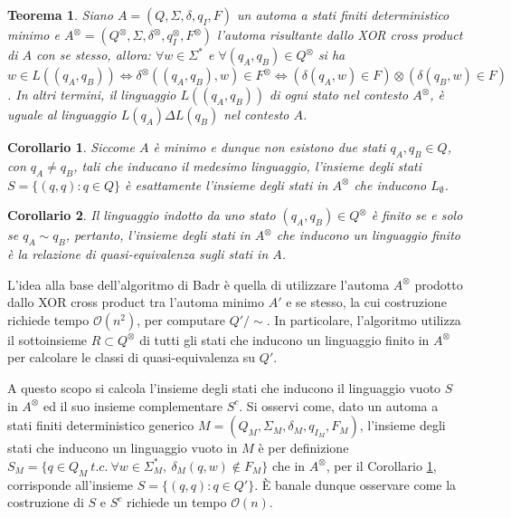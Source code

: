 \documentclass[a4paper,12pt]{report} %
\newcommand{\partitioned}[2]{#1\slash\!\!#2}  %
\newcommand{\bigo}[0]{\mathcal{O}}            %
\newtheorem{theorem}{Teorema}[chapter]        %
\newtheorem{corollary}{Corollario}[theorem]   %
\begin{document}
\begin{theorem}\label{th:cross-prod-state-aeq}
  Siano $A = (Q, \Sigma, \delta, q_I, F)$ un automa a stati finiti deterministico minimo e 
  $A^\otimes = (Q^\otimes, \Sigma, \delta^\otimes, q_{I}^\otimes, F^\otimes)$ l'automa risultante dallo 
  XOR cross product di $A$ con se stesso, allora: $\forall w \in \Sigma^*$ e $\forall (q_A, q_B) \in Q^\otimes$
  si ha $w \in L((q_A, q_B)) \Leftrightarrow \delta^\otimes((q_A, q_B), w) \in F^\otimes \Leftrightarrow 
  (\delta(q_A, w) \in F) \otimes (\delta(q_B, w) \in F)$.
  In altri termini, il linguaggio $L((q_A, q_B))$ di ogni stato nel contesto $A^\otimes$, è uguale al linguaggio
  $L(q_A) \Delta L(q_B)$ nel contesto $A$.
\end{theorem}
\begin{corollary}\label{cor:cross-prod-state-aeq-S}
  Siccome $A$ è minimo e dunque non esistono due stati $q_A, q_B \in Q$, con $q_A \neq q_B$, tali che inducano 
  il medesimo linguaggio, l'insieme degli stati $S = \{ (q, q) : q \in Q \}$ è esattamente l'insieme degli
  stati in $A^\otimes$ che inducono $L_\emptyset$.
\end{corollary}
\begin{corollary}\label{cor:cross-prod-state-aeq-states}
  Il linguaggio indotto da uno stato $(q_A, q_B) \in Q^\otimes$ è finito se e solo se $q_A \sim q_B$, pertanto, 
  l'insieme degli stati in $A^\otimes$ che inducono un linguaggio finito è la relazione di quasi-equivalenza
  sugli stati in $A$.
\end{corollary}

L'idea alla base dell'algoritmo di Badr è quella di utilizzare l'automa $A^\otimes$ prodotto dallo 
XOR cross product tra l'automa minimo $A'$ e se stesso, la cui costruzione richiede tempo $\bigo(n^2)$,
per computare $\partitioned{Q'}{\sim}$.
In particolare, l'algoritmo utilizza il sottoinsieme $R \subset Q^\otimes$ di tutti gli stati
che inducono un linguaggio finito in $A^\otimes$ per calcolare le classi di quasi-equivalenza su $Q'$.

A questo scopo si calcola l'insieme degli stati che inducono il linguaggio vuoto $S$ in $A^\otimes$ ed il suo 
insieme complementare $S^c$. Si osservi come, dato un automa a stati finiti deterministico generico 
$M = (Q_M, \Sigma_M, \delta_M, q_{I_M}, F_M)$, l'insieme degli stati che inducono un linguaggio vuoto in $M$
è per definizione $S_M = \{q \in Q_M \ t.c. \ \forall w \in \Sigma^*_M, \ \delta_M(q, w) \notin F_M\}$ che in
$A^\otimes$, per il Corollario \ref{cor:cross-prod-state-aeq-S}, corrisponde all'insieme $S = \{ (q, q) : q \in Q' \}$. 
È banale dunque osservare come la costruzione di $S$ e $S^c$ richiede un tempo $\bigo(n)$.
\end{document}
